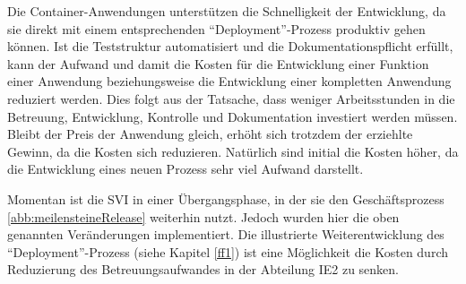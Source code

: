 \par
Die Container-Anwendungen unterstützen die Schnelligkeit der Entwicklung, da sie direkt mit einem entsprechenden \enquote{Deployment}-Prozess produktiv gehen können. Ist die Teststruktur automatisiert und die Dokumentationspflicht erfüllt, kann der Aufwand und damit die Kosten für die Entwicklung einer Funktion einer Anwendung beziehungsweise die Entwicklung einer kompletten Anwendung reduziert werden. Dies folgt aus der Tatsache, dass weniger Arbeitsstunden in die Betreuung, Entwicklung, Kontrolle und Dokumentation investiert werden müssen. Bleibt der Preis der Anwendung gleich, erhöht sich trotzdem der erziehlte Gewinn, da die Kosten sich reduzieren. Natürlich sind initial die Kosten höher, da die Entwicklung eines neuen Prozess sehr viel Aufwand darstellt.
\par
Momentan ist die \ac{SVI} in einer Übergangsphase, in der sie den Geschäftsprozess \vref{abb:meilensteineRelease} weiterhin nutzt. Jedoch wurden hier die oben genannten Veränderungen implementiert. Die illustrierte Weiterentwicklung des \enquote{Deployment}-Prozess (siehe Kapitel \vref{ff1}) ist eine Möglichkeit die Kosten durch Reduzierung des Betreuungsaufwandes in der Abteilung \ac{IE2} zu senken.

